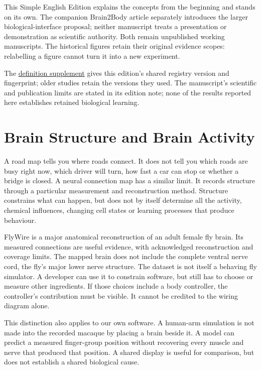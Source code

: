 This Simple English Edition explains the concepts from the beginning and
stands on its own. The companion Brain2Body article separately introduces the
larger biological-interface proposal; neither manuscript treats a presentation
or demonstration as scientific authority.\cite{brain2bodyworking} Both remain
unpublished working manuscripts. The historical figures retain their original
evidence scopes: relabelling a figure cannot turn it into a new experiment.

The \hyperref[programme-definitions]{definition supplement} gives this edition's
shared registry version and fingerprint; older studies retain the versions they
used. The manuscript's scientific and publication limits are stated in its edition note;
none of the results reported here establishes retained biological learning.

\section{Brain Structure and Brain Activity}

A road map tells you where roads connect. It does not tell you which roads are
busy right now, which driver will turn, how fast a car can stop or whether a
bridge is closed. A neural connection map has a similar limit. It records
structure through a particular measurement and reconstruction method. Structure
constrains what can happen, but does not by itself determine all the activity,
chemical influences, changing cell states or learning processes that produce
behaviour.

FlyWire is a major anatomical reconstruction of an adult female fly brain.
Its measured connections are useful evidence, with acknowledged reconstruction
and coverage limits. The mapped brain does not include the complete ventral
nerve cord, the fly's major lower nerve structure. The dataset is not itself a
behaving fly simulator.\cite{flywire2024} A developer can use it to constrain
software, but still has to choose or measure other ingredients. If those
choices include a body controller, the controller's contribution must be
visible. It cannot be credited to the wiring diagram alone.

This distinction also applies to our own software. A human-arm simulation is
not made into the recorded macaque by placing a brain beside it. A model can
predict a measured finger-group position without recovering every muscle and
nerve that produced that position. A shared display is useful for comparison,
but does not establish a shared biological cause.

